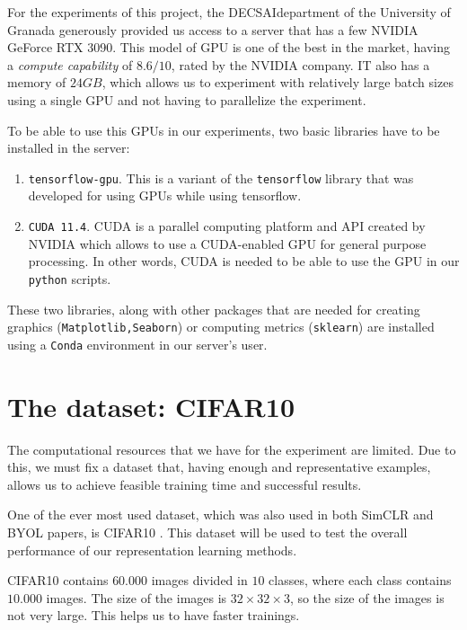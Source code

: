 For the experiments of this project, the DECSAI\footnotemark department of the University of Granada generously provided us access to a server that has a few NVIDIA GeForce RTX 3090. This model of GPU is one of the best in the market, having a \emph{compute capability} of $8.6/10$, rated by the NVIDIA company. IT also has a memory of $24GB$, which allows us to experiment with relatively large batch sizes using a single GPU and not having to parallelize the experiment.



To be able to use this GPUs in our experiments, two basic libraries have to be installed in the server:
\begin{enumerate}
\item \lstinline{tensorflow-gpu}. This is a variant of the \lstinline{tensorflow} library that was developed for using GPUs while using tensorflow.
\item \lstinline{CUDA 11.4}. CUDA is a parallel computing platform and API created by NVIDIA which allows to use a CUDA-enabled GPU for general purpose processing. In other words, CUDA is needed to be able to use the GPU in our \lstinline{python} scripts.
\end{enumerate}

These two libraries, along with other packages that are needed for creating graphics (\lstinline{Matplotlib,Seaborn}) or computing metrics (\lstinline{sklearn}) are installed using a \lstinline{Conda} environment in our server's user.


\section{The dataset: CIFAR10}

The computational resources that we have for the experiment are limited. Due to this, we must fix a dataset that, having enough and representative examples, allows us to achieve feasible training time and successful results.

One of the ever most used dataset, which was also used in both SimCLR and BYOL papers, is CIFAR10 \citep{krizhevsky_learning_nodate}. This dataset will be used to test the overall performance of our representation learning methods.

CIFAR10 contains $60.000$ images divided in $10$ classes, where each class contains $10.000$ images. The size of the images is $32\times 32\times 3$, so the size of the images is not very large. This helps us to have faster trainings.

